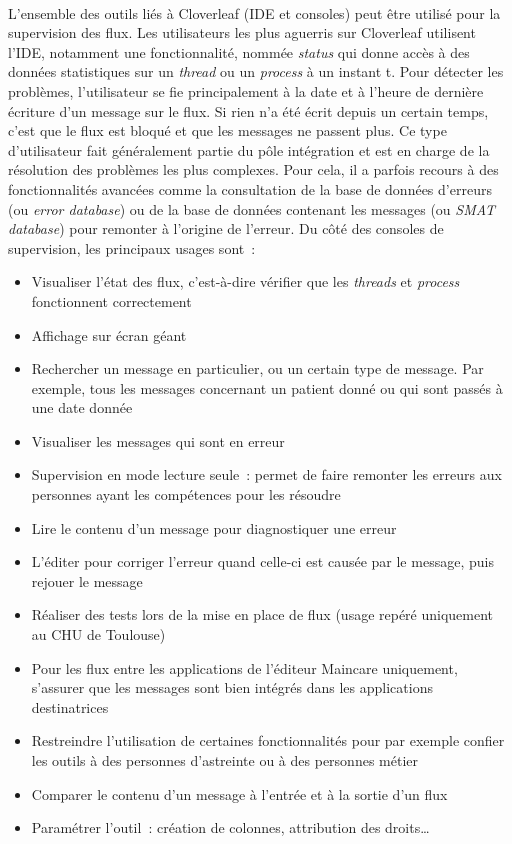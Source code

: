			\paragraph{}%
			L’ensemble des outils liés à Cloverleaf (IDE et consoles)
			peut être utilisé pour la supervision des flux. Les utilisateurs les plus
			aguerris sur Cloverleaf utilisent l’IDE, notamment une fonctionnalité,
			nommée \textit{status} qui donne accès à des données statistiques sur un
			\textit{thread} ou un \textit{process} à un instant t. Pour détecter les
			problèmes, l’utilisateur se fie principalement à la date et à l'heure de dernière
			écriture d’un message sur le flux. Si rien n’a été écrit depuis un certain temps, c’est que
			le flux est bloqué et que les messages ne passent plus. Ce type d’utilisateur
			fait généralement partie du pôle intégration et est en charge de la
			résolution des problèmes les plus complexes.
			Pour cela, il a parfois recours à des fonctionnalités avancées comme la
			consultation de la base de données d'erreurs (ou \textit{error database}) ou
			de la base de données contenant les messages (ou \textit{SMAT database})
			pour remonter à l’origine de l’erreur.\newline
			Du côté des consoles de supervision, les principaux usages sont~:
			\begin{itemize}
			  \item Visualiser l’état des flux, c'est-à-dire vérifier que les
			  \textit{threads} et \textit{process} fonctionnent correctement
			  \item Affichage sur écran géant
			  \item Rechercher un message en particulier, ou un certain type de
			  message. Par exemple, tous les messages concernant un patient donné ou
			  qui sont passés à une date donnée
			  \item Visualiser les messages qui sont en erreur
			  \item Supervision en mode lecture seule~: permet de faire remonter les
			  erreurs aux personnes ayant les compétences pour les résoudre
			  \item Lire le contenu d'un message pour diagnostiquer une erreur
			  \item L'éditer pour corriger l'erreur quand celle-ci est causée par le
			  message, puis rejouer le message
			  \item Réaliser des tests lors de la mise en place de flux (usage repéré
			  uniquement au CHU de Toulouse)
			  \item Pour les flux entre les applications de l'éditeur Maincare
			  uniquement, s’assurer que les messages sont bien intégrés dans les
			  applications destinatrices
			  \item Restreindre l’utilisation de certaines fonctionnalités pour par
			  exemple confier les outils à des personnes d’astreinte ou à des personnes
			  métier
			  \item Comparer le contenu d’un message à l'entrée et à la sortie d'un flux
			  \item Paramétrer l’outil~: création de colonnes, attribution des droits…
			\end{itemize}
